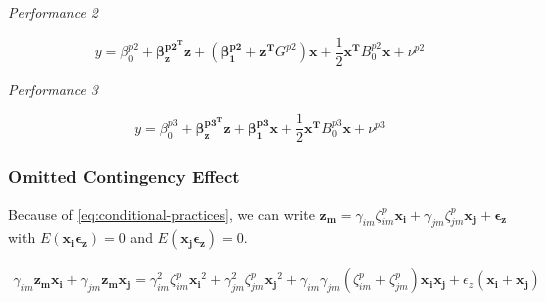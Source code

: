 \documentclass[12pt]{article}
\begin{document}
\emph{Performance 2}

\begin{equation*}
    y = \beta_0^{p2} + \mathbf{\beta_z^{p2^T} z} + (\mathbf{\beta_1^{p2}} + \mathbf{z^T} G^{p2}) \mathbf{x} + 
    \frac{1}{2}\mathbf{x^T} B_0^{p2} \mathbf{x} + \nu^{p2}
\end{equation*}

\emph{Performance 3} 
 
\begin{equation*}
    y = \beta_0^{p3} + \mathbf{\beta_z^{p3^T} z} + \mathbf{\beta_1^{p3}} \mathbf{x} + 
    \frac{1}{2}\mathbf{x^T} B_0^{p3} \mathbf{x} + \nu^{p3}
\end{equation*}

 
 
\subsubsection{Omitted Contingency Effect}

Because of \eqref{eq:conditional-practices}, we can write $\mathbf{z_m} = \gamma_{im} \zeta^p_{im} \mathbf{x_i} + \gamma_{jm} \zeta^p_{jm} \mathbf{x_j} + \mathbf{\epsilon_z}$ with $E(\mathbf{x_i \epsilon_z}) = 0$ and $E(\mathbf{x_j \epsilon_z}) = 0$.
 
\begin{align*}
\gamma_{im} \mathbf{z_m} \mathbf{x_i} + \gamma_{jm} \mathbf{z_m} \mathbf{x_j}
= \gamma^2_{im} \zeta^p_{im} \mathbf{x_i}^2 + \gamma^2_{jm} \zeta^p_{jm} \mathbf{x_j}^2 
    + \gamma_{im} \gamma_{jm} (\zeta^p_{im} + \zeta^p_{jm}) \mathbf{x_i x_j} 
    + \epsilon_z ( \mathbf{x_i} + \mathbf{x_j})\\
\end{align*}
\end{document}
